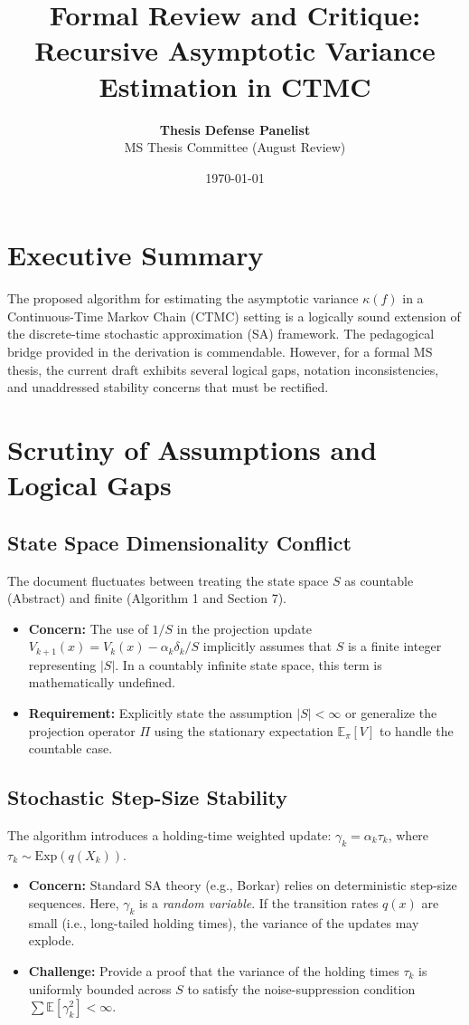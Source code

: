 \documentclass[11pt]{article}
\title{\textbf{Formal Review and Critique: \\ Recursive Asymptotic Variance Estimation in CTMC}}
\author{\textbf{Thesis Defense Panelist} \\ MS Thesis Committee (August Review)}
\date{\today}
\begin{document}
\maketitle

\section*{Executive Summary}
The proposed algorithm for estimating the asymptotic variance $\kappa(f)$ in a Continuous-Time Markov Chain (CTMC) setting is a logically sound extension of the discrete-time stochastic approximation (SA) framework. The pedagogical bridge provided in the derivation is commendable. However, for a formal MS thesis, the current draft exhibits several logical gaps, notation inconsistencies, and unaddressed stability concerns that must be rectified.

\section{Scrutiny of Assumptions and Logical Gaps}

\subsection{State Space Dimensionality Conflict}
The document fluctuates between treating the state space $S$ as countable (Abstract) and finite (Algorithm 1 and Section 7).
\begin{itemize}
    \item \textbf{Concern:} The use of $1/S$ in the projection update $V_{k+1}(x) = V_k(x) - \alpha_k \delta_k / S$ implicitly assumes that $S$ is a finite integer representing $|S|$. In a countably infinite state space, this term is mathematically undefined.
    \item \textbf{Requirement:} Explicitly state the assumption $|S| < \infty$ or generalize the projection operator $\Pi$ using the stationary expectation $\mathbb{E}_\pi[V]$ to handle the countable case.
\end{itemize}

\subsection{Stochastic Step-Size Stability}
The algorithm introduces a holding-time weighted update: $\gamma_k = \alpha_k \tau_k$, where $\tau_k \sim \text{Exp}(q(X_k))$.
\begin{itemize}
    \item \textbf{Concern:} Standard SA theory (e.g., Borkar) relies on deterministic step-size sequences. Here, $\gamma_k$ is a \textit{random variable}. If the transition rates $q(x)$ are small (i.e., long-tailed holding times), the variance of the updates may explode.
    \item \textbf{Challenge:} Provide a proof that the variance of the holding times $\tau_k$ is uniformly bounded across $S$ to satisfy the noise-suppression condition $\sum \mathbb{E}[\gamma_k^2] < \infty$.
\end{itemize}
\end{document}
